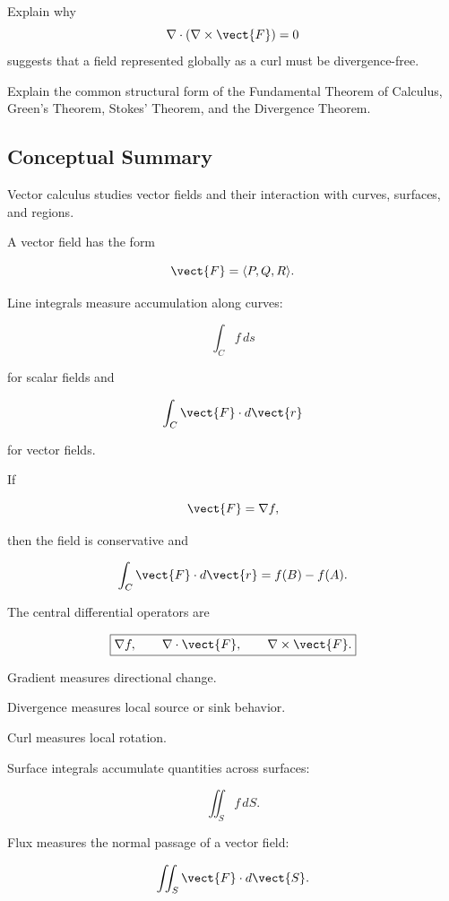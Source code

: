 \begin{exercise}[3]
Explain why
\[ \nabla\cdot(\nabla\times\vect{F})=0 \]
suggests that a field represented globally as a curl must be divergence-free.
\end{exercise}

\begin{exercise}[3]
Explain the common structural form of the Fundamental Theorem of Calculus,
Green's Theorem, Stokes' Theorem, and the Divergence Theorem.
\end{exercise}

\subsection{Conceptual Summary}
\label{subsec:vector-calculus-summary}

Vector calculus studies vector fields and their interaction with curves,
surfaces, and regions.

A vector field has the form

\[ \vect{F}=\langle P,Q,R\rangle. \]

Line integrals measure accumulation along curves:

\[ \int_Cf\,ds \]

for scalar fields and

\[ \int_C\vect{F}\cdot d\vect{r} \]

for vector fields.

If

\[ \vect{F}=\nabla f, \]

then the field is conservative and

\[ \int_C\vect{F}\cdot d\vect{r}=f(B)-f(A). \]

The central differential operators are

\[ \boxed{
\nabla f,\qquad
\nabla\cdot\vect{F},\qquad
\nabla\times\vect{F}.
} \]

Gradient measures directional change.

Divergence measures local source or sink behavior.

Curl measures local rotation.

Surface integrals accumulate quantities across surfaces:

\[ \iint_Sf\,dS. \]

Flux measures the normal passage of a vector field:

\[ \iint_S\vect{F}\cdot d\vect{S}. \]

